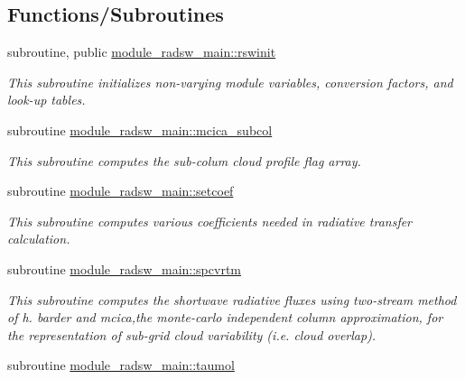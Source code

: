 \subsection*{Functions/\+Subroutines}
\begin{DoxyCompactItemize}
\item 
subroutine, public \hyperlink{namespacemodule__radsw__main_afab73c508f778203d0f4b5181f1cbca9}{module\+\_\+radsw\+\_\+main\+::rswinit}                                                                                             
\begin{DoxyCompactList}\small\item\em This subroutine initializes non-\/varying module variables, conversion factors, and look-\/up tables. \end{DoxyCompactList}\item 
subroutine \hyperlink{namespacemodule__radsw__main_a97297a02cb1e23f2449918dfdacd9745}{module\+\_\+radsw\+\_\+main\+::mcica\+\_\+subcol}                                                                                   
\begin{DoxyCompactList}\small\item\em This subroutine computes the sub-\/colum cloud profile flag array. \end{DoxyCompactList}\item 
subroutine \hyperlink{namespacemodule__radsw__main_ab24dd3a4fae5749bf7ce09eebe6deb30}{module\+\_\+radsw\+\_\+main\+::setcoef}                                                                                             
\begin{DoxyCompactList}\small\item\em This subroutine computes various coefficients needed in radiative transfer calculation. \end{DoxyCompactList}\item 
subroutine \hyperlink{namespacemodule__radsw__main_a3f2a98a5eece3e3904d164adce213d7a}{module\+\_\+radsw\+\_\+main\+::spcvrtm}                                                                                             
\begin{DoxyCompactList}\small\item\em This subroutine computes the shortwave radiative fluxes using two-\/stream method of h. barder and mcica,the monte-\/carlo independent column approximation, for the representation of sub-\/grid cloud variability (i.\+e. cloud overlap). \end{DoxyCompactList}\item 
subroutine \hyperlink{namespacemodule__radsw__main_afbfb76d4fab10254e065dce350ae5f2b}{module\+\_\+radsw\+\_\+main\+::taumol}                                                                                               

\end{DoxyCompactItemize}
